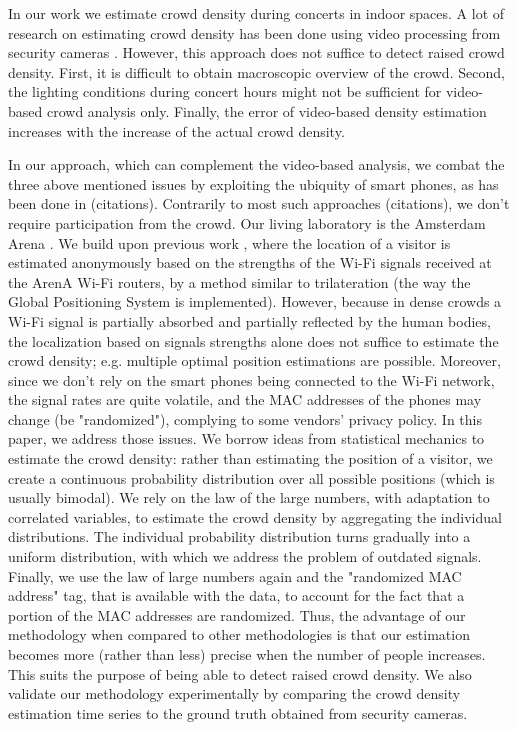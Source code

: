 \documentclass[10pt,a4paper]{article}
\begin{document}
In our work we estimate crowd density during concerts in indoor spaces. A lot of research on estimating crowd density has been done using video processing from security cameras \cite{Crowded_Scene_Analysis, Krausz2012307}. However, this approach does not suffice to detect raised crowd density. First, it is difficult to obtain macroscopic overview of the crowd. Second, 
the lighting conditions during concert hours might not be sufficient for video-based crowd analysis only. Finally, the error of video-based density estimation increases with the increase of the actual crowd density.  

In our approach, which can complement the video-based analysis, we combat the three above mentioned issues by exploiting the ubiquity of smart phones, as has been done in (citations). Contrarily to most such approaches (citations), we  don't require participation from the crowd. Our living laboratory is the Amsterdam Arena \cite{arena}.  We build upon previous work \cite{customers_jan}, where the location of a visitor is estimated anonymously based on the strengths of the Wi-Fi signals received at the ArenA Wi-Fi routers,  by a method similar to trilateration (the way the Global Positioning System is implemented). However, because in dense crowds a Wi-Fi signal is partially absorbed and partially reflected by the human bodies, the localization based on signals strengths alone does not suffice to estimate the crowd density; e.g. multiple optimal position estimations are possible.  Moreover, since we don't rely on the smart phones being connected to the Wi-Fi network, the signal rates are quite volatile, and the MAC addresses of the phones may change (be "randomized"), complying to some  vendors' privacy policy. In this paper, we address those issues. We borrow ideas from statistical mechanics to estimate the crowd density: rather than estimating the position of a visitor, we create a continuous probability distribution over all possible positions (which is usually bimodal). We rely on the law of the large numbers, with adaptation to correlated variables, to estimate the crowd density by aggregating the individual distributions. The individual probability distribution turns gradually into a uniform distribution, with which we address the problem of outdated signals. Finally, we use the law of large numbers again and the "randomized MAC address" tag, that is available with the data, to account for the fact that a portion of the MAC addresses are randomized. Thus, the advantage of our methodology when compared to other methodologies is that our estimation becomes more (rather than less) precise when the number of people increases. This suits the purpose of being able to detect raised crowd density. 
We also validate our methodology experimentally by comparing the crowd density estimation time series to the ground truth obtained from security cameras. 
\end{document}
